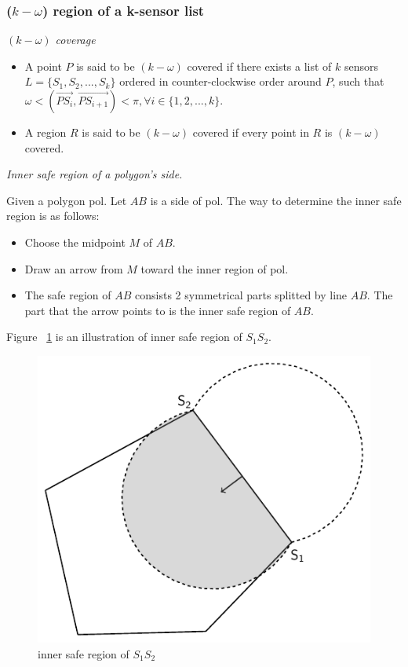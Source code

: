 
\subsubsection{($k-\omega$) region of a k-sensor list}
\begin{df} 
{\itshape$(k-\omega)$ coverage}
\begin{itemize}
	\item A point $P$ is said to be $(k-\omega)$ covered if there exists a list of $k$ sensors $L = \{S_1, S_2,...,S_k\}$ ordered in counter-clockwise order around $P$, such that $\omega < (\overrightarrow{PS_i}, \overrightarrow{PS_{i+1}}) < \pi, \forall i \in \{1,2,...,k\}$.
	\item A region $R$ is said to be $(k-\omega)$ covered if every point in $R$ is $(k-\omega)$ covered.
\end{itemize}
\end{df}
\begin{df}
{\itshape Inner safe region of a polygon's side.}\par
Given a polygon {\sc pol}. Let $AB$ is a side of {\sc pol}. The way to determine the inner safe region is as follows:
\begin{itemize}
	\item Choose the midpoint $M$ of $AB$.
	\item Draw an arrow from $M$ toward the inner region of {\sc pol}.
	\item The safe region of $AB$ consists 2 symmetrical parts splitted by line $AB$. The part that the arrow points to is the inner safe region of $AB$.
\end{itemize}
\end{df}
Figure ~\ref{innersafe} is an illustration of inner safe region of $S_1S_2$.
\begin{figure}[!h]
	\begin{center}
	\includegraphics[scale=1.]{innersafe.pdf}	
	\caption{inner safe region of $S_1S_2$}
	\label{innersafe}
	\end{center}
\end{figure}
